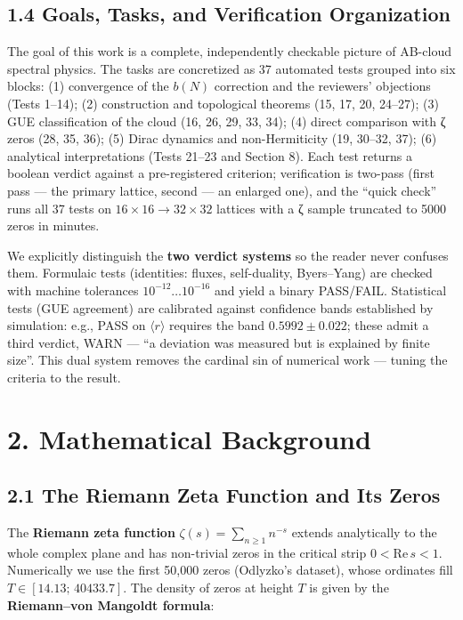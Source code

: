 \documentclass[
]{article}
\begin{document}
\subsection{1.4 Goals, Tasks, and Verification
Organization}\label{goals-tasks-and-verification-organization}

The goal of this work is a complete, independently checkable picture of
AB-cloud spectral physics. The tasks are concretized as 37 automated
tests grouped into six blocks: (1) convergence of the \(b(N)\)
correction and the reviewers' objections (Tests 1--14); (2) construction
and topological theorems (15, 17, 20, 24--27); (3) GUE classification of
the cloud (16, 26, 29, 33, 34); (4) direct comparison with ζ zeros (28,
35, 36); (5) Dirac dynamics and non-Hermiticity (19, 30--32, 37); (6)
analytical interpretations (Tests 21--23 and Section 8). Each test
returns a boolean verdict against a pre-registered criterion;
verification is two-pass (first pass --- the primary lattice, second ---
an enlarged one), and the ``quick check'' runs all 37 tests on
\(16\times16\to32\times32\) lattices with a ζ sample truncated to 5000
zeros in minutes.

We explicitly distinguish the \textbf{two verdict systems} so the reader
never confuses them. Formulaic tests (identities: fluxes, self-duality,
Byers--Yang) are checked with machine tolerances
\(10^{-12}\dots10^{-16}\) and yield a binary PASS/FAIL. Statistical
tests (GUE agreement) are calibrated against confidence bands
established by simulation: e.g., PASS on \(\langle r\rangle\) requires
the band \(0.5992\pm0.022\); these admit a third verdict, WARN --- ``a
deviation was measured but is explained by finite size''. This dual
system removes the cardinal sin of numerical work --- tuning the
criteria to the result.

\section{2. Mathematical Background}\label{mathematical-background}

\subsection{2.1 The Riemann Zeta Function and Its
Zeros}\label{the-riemann-zeta-function-and-its-zeros}

The \textbf{Riemann zeta function} \(\zeta(s) = \sum_{n\ge1} n^{-s}\)
extends analytically to the whole complex plane and has non-trivial
zeros in the critical strip \(0<\mathrm{Re}\,s<1\). Numerically we use
the first 50,000 zeros (Odlyzko's dataset), whose ordinates fill
\(T\in[14.13;\,40433.7]\). The density of zeros at height \(T\) is given
by the \textbf{Riemann--von Mangoldt formula}:
\end{document}
